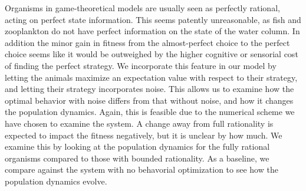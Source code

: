 Organisms in game-theoretical models are usually seen as perfectly rational, acting on perfect state information. This seems patently unreasonable, as fish and zooplankton do not have perfect information on the state of the water column. In addition the minor gain in fitness from the almost-perfect choice to the perfect choice seems like it would be outweighed by the higher cognitive or sensorial cost of finding the perfect strategy.
 We incorporate this feature in our model by letting the animals maximize an expectation value with respect to their strategy, and letting their strategy incorporates noise. This allows us to examine how the optimal behavior with noise differs from that without noise, and how it changes the population dynamics. Again, this is feasible due to the numerical scheme we have chosen to examine the system. A change away from full rationality is expected to impact the fitness negatively, but it is unclear by how much. We examine this by looking at the population dynamics for the fully rational organisms compared to those with bounded rationality. As a baseline, we compare against the system with no behavorial optimization to see how the population dynamics evolve.











